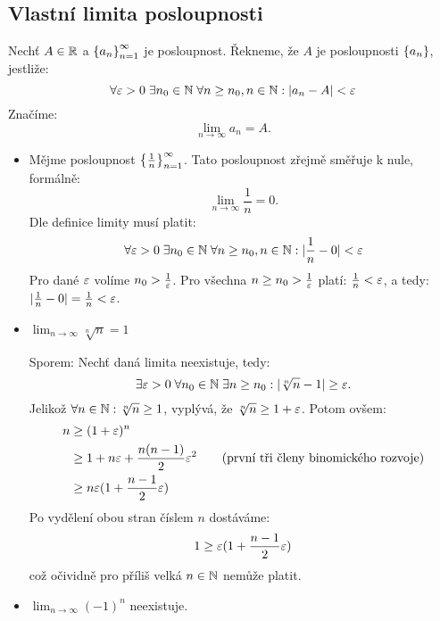 \subsection{Vlastní limita posloupnosti}

\begin{definition}
    Nechť $A \in \mathbb{R}$ a $\left\{a_n\right\}_{n=1}^\infty$ je posloupnost. Řekneme, že $A$ je 
     posloupnosti $\left\{a_n\right\}$, jestliže:
    $$\forall \varepsilon > 0 \; \exists n_0 \in \mathbb{N} \; \forall n \geq n_0,n\in \mathbb{N}: |a_n - A| < \varepsilon$$
    Značíme: $$\lim_{n\to\infty}a_n = A.$$
\end{definition}

\begin{remark}
    \label{remark:limitexamples}
    \leavevmode
    \begin{itemize}
        \item
            Mějme posloupnost $\left\{\frac{1}{n}\right\}_{n=1}^\infty$. 
            Tato posloupnost zřejmě směřuje k nule, formálně: $$\lim_{n\to\infty}
            \frac{1}{n} = 0.$$
            Dle definice limity musí platit:
            $$\forall \varepsilon > 0 \; \exists n_0 \in \mathbb{N} \; \forall n \geq n_0,n\in \mathbb{N}: 
            |\frac{1}{n} - 0| < \varepsilon$$
            Pro dané $\varepsilon$ volíme $n_0 > \frac{1}{\varepsilon}$.
            Pro všechna $n \geq n_0 > \frac{1}{\varepsilon}$ platí: $\frac{1}{n} < \varepsilon$, a tedy: 
            $|\frac{1}{n} - 0| = \frac{1}{n} < \varepsilon$.
        \item
            $\lim_{n\to\infty}\sqrt[n]{n} = 1$

            Sporem: Nechť daná limita neexistuje, tedy: 
            $$\exists \varepsilon > 0 \; \forall n_0 \in \mathbb{N} \; 
            \exists n \geq n_0: |\sqrt[n]{n} - 1| \geq \varepsilon.$$ 
            Jelikož $\forall n \in \mathbb{N}: \sqrt[n]{n} \geq 1$, 
            vyplývá, že $\sqrt[n]{n} \geq 1 + \varepsilon$. Potom ovšem:
            \begin{align*}
                n &\geq (1 + \varepsilon)^n \\
                  &\geq 1 + n\varepsilon + \frac{n(n-1)}{2}\varepsilon^2 \tag{první tři členy 
                    binomického rozvoje} \\
                  &\geq n\varepsilon(1 + \frac{n-1}{2}\varepsilon)
            \end{align*}
            Po vydělení obou stran číslem $n$ dostáváme:
            $$1 \geq \varepsilon(1 + \frac{n-1}{2}\varepsilon)$$
            což očividně pro příliš velká $n \in \mathbb{N}$ nemůže platit.
        \item
            $\lim_{n\to\infty} (-1)^n$ neexistuje. 
            

\end{itemize}
\end{remark}
